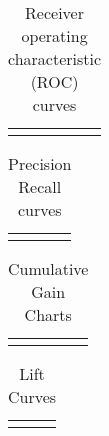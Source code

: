 \documentclass{article}
\begin{document}
\clearpage
{}
\begin{landscape}


\begin{table}
  \begin{tabular}{ccc}
    & \\
  \end{tabular}
  \caption{Receiver operating characteristic (ROC) curves}
\end{table}


\begin{table}
  \begin{tabular}{ccc}
    & \\
  \end{tabular}
  \caption{Precision Recall curves}
\end{table}


\begin{table}
  \begin{tabular}{ccc}
    & \\
  \end{tabular}
  \caption{Cumulative Gain Charts}
\end{table}


\begin{table}
  \begin{tabular}{ccc}
    & \\
  \end{tabular}
  \caption{Lift Curves}
\end{table}

\end{landscape}
\end{document}
